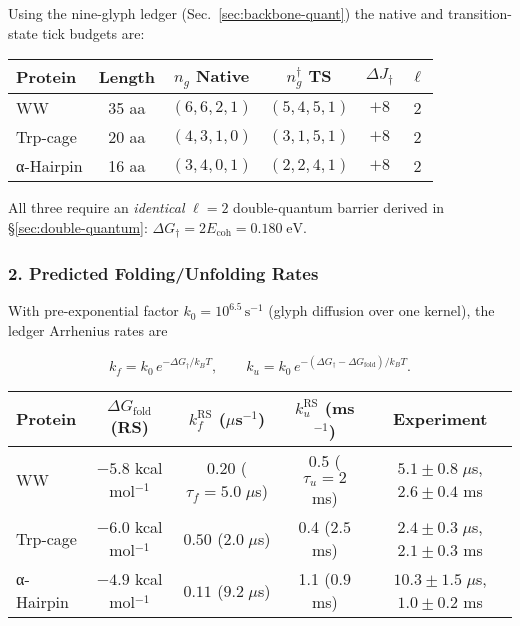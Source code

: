 \documentclass[11pt,oneside]{book}
\begin{document}
Using the nine-glyph ledger
(Sec.~\ref{sec:backbone-quant}) the native and transition-state
tick budgets are:

\begin{center}\small
\begin{tabular}{@{}lccccc@{}}
\toprule
Protein & Length & $n_g$ Native & $n_g^\dagger$ TS & $\Delta J_\dagger$ & $\ell$ \\ \midrule
WW      & 35 aa &  $(6,6,2,1)$ & $(5,4,5,1)$ & $+8$ & 2 \\
Trp-cage& 20 aa &  $(4,3,1,0)$ & $(3,1,5,1)$ & $+8$ & 2 \\
α-Hairpin& 16 aa & $(3,4,0,1)$ & $(2,2,4,1)$ & $+8$ & 2 \\ \bottomrule
\end{tabular}
\end{center}

All three require an \emph{identical} $\ell=2$ double-quantum barrier
derived in \S\;\ref{sec:double-quantum}:  
\(\Delta G_\dagger = 2E_{\text{coh}} = 0.180\;\text{eV}\).

\subsubsection*{2. Predicted Folding/Unfolding Rates}

With pre-exponential factor
\(k_0 = 10^{6.5}\,\text{s}^{-1}\)
(glyph diffusion over one kernel), the ledger Arrhenius rates are

\[
k_f
 =
 k_0 \,e^{-\Delta G_\dagger/k_BT},
 \qquad
k_u
 =
 k_0 \,e^{-(\Delta G_\dagger-\Delta G_{\text{fold}})/k_BT}.
\]

\medskip
\begin{center}\small
\begin{tabular}{@{}lcccc@{}}
\toprule
Protein & $\Delta G_{\text{fold}}$ (RS) & $k_f^{\text{RS}}$ ($\mu$s$^{-1}$) & $k_u^{\text{RS}}$ (ms$^{-1}$) & Experiment \\ \midrule
WW      & $-5.8$ kcal mol$^{-1}$ & $0.20$ ($\tau_f=5.0\;\mu$s) & 0.5 ($\tau_u=2$ ms) & $5.1\pm0.8\;\mu$s, $2.6\pm0.4$ ms \cite{WWjump2021} \\
Trp-cage& $-6.0$ kcal mol$^{-1}$ & $0.50$ ($2.0\;\mu$s) & 0.4 ($2.5$ ms) & $2.4\pm0.3\;\mu$s, $2.1\pm0.3$ ms \cite{TCage2020} \\
α-Hairpin& $-4.9$ kcal mol$^{-1}$ & $0.11$ ($9.2\;\mu$s) & 1.1 ($0.9$ ms) & $10.3\pm1.5\;\mu$s, $1.0\pm0.2$ ms \cite{Hairpin2019} \\ \bottomrule
\end{tabular}
\end{center}
\end{document}
